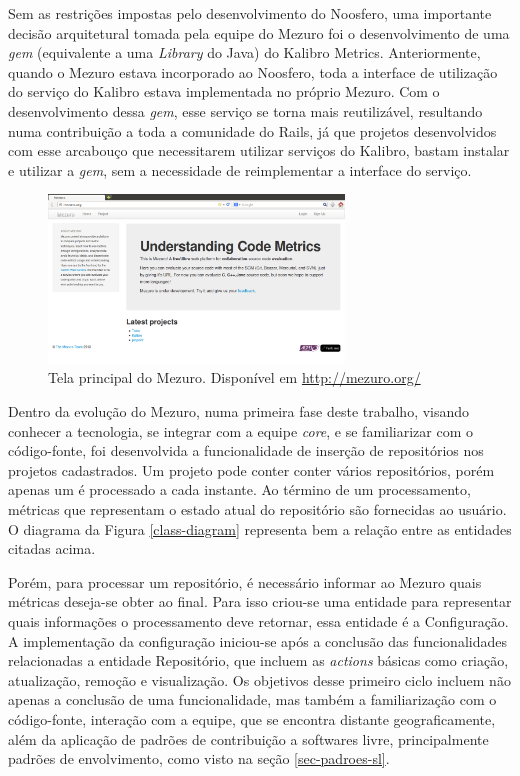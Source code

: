Sem as restrições impostas pelo desenvolvimento do Noosfero, uma importante decisão arquitetural tomada pela equipe do Mezuro foi o desenvolvimento de uma \textit{gem} (equivalente a uma \textit{Library} do Java) do Kalibro Metrics. Anteriormente, quando o Mezuro estava incorporado ao Noosfero, toda a interface de utilização do serviço do Kalibro estava implementada no próprio Mezuro. Com o desenvolvimento dessa \textit{gem}, esse serviço se torna mais reutilizável, resultando numa contribuição a toda a comunidade do Rails, já que projetos desenvolvidos com esse arcabouço que necessitarem utilizar serviços do Kalibro, bastam instalar e utilizar a \textit{gem}, sem a necessidade de reimplementar a interface do serviço.

\graphicspath{{figuras/}}
\begin{figure}[htpb]
\centering
\includegraphics[width=0.7\textwidth]{mezuro-standalone}
\caption{Tela principal do Mezuro. Disponível em \url{http://mezuro.org/}}
\label{mezuro}
\end{figure}

Dentro da evolução do Mezuro, numa primeira fase deste trabalho, visando conhecer a tecnologia, se integrar com a equipe \textit{core}, e se familiarizar com o código-fonte, foi desenvolvida a funcionalidade de inserção de repositórios nos projetos cadastrados. Um projeto pode conter conter vários repositórios, porém apenas um é processado a cada instante. Ao término de um processamento, métricas que representam o estado atual do repositório são fornecidas ao usuário. O diagrama da Figura \ref{class-diagram} representa bem a relação entre as entidades citadas acima. 

Porém, para processar um repositório, é necessário informar ao Mezuro quais métricas deseja-se obter ao final. Para isso criou-se uma entidade para representar quais informações o processamento deve retornar, essa entidade é a Configuração.
%
A implementação da configuração iniciou-se após a conclusão das funcionalidades relacionadas a entidade Repositório, que incluem as \textit{actions} básicas como criação, atualização, remoção e visualização. Os objetivos desse primeiro ciclo incluem não apenas a conclusão de uma funcionalidade, mas também a familiarização com o código-fonte, interação com a equipe, que se encontra distante geograficamente, além da aplicação de padrões de contribuição a softwares livre, principalmente padrões de envolvimento, como visto na seção \ref{sec-padroes-sl}.

